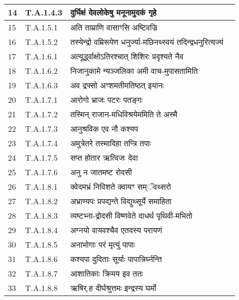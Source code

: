 \documentclass[17pt]{extarticle}
\begin{document}
\begin{longtable}{||p{0.4in}||p{0.9in}||p{4.0in}||p{0.9in}||}
        \hline
            14 & T.A.1.4.3 & दुर्भिक्षं देवलोकेषु मनूनामुदकं गृहे &      \\
        \hline
            15 & T.A.1.5.1 & अति ताम्राणि वासाꣳसि अष्टिवज्रि &      \\
        \hline
            16 & T.A.1.5.2 & तस्येन्द्रो वम्रिरूपेण धनुर्ज्या{-}मछिनथ्स्वयं तदिन्द्रधनुरित्यज्यं &      \\
        \hline
            17 & T.A.1.6.1 & अत्यूर्द्ध्वाक्षोऽतिरश्चात् शिशिरः प्रदृश्यते नैव &      \\
        \hline
            18 & T.A.1.6.2 & निजानुकामे न्यञ्जलिका अमी वाच{-}मुपासतामिति &      \\
        \hline
            19 & T.A.1.6.3 & अव द्रफ्सो अꣳशमतीमतिष्ठत् इयानः &      \\
        \hline
            20 & T.A.1.7.1 & आरोगो भ्राजः पटरः पतङ्गः &      \\
        \hline
            21 & T.A.1.7.2 & तस्मिन् राजान{-}मधिविश्रयेममिति ते अस्मै &      \\
        \hline
            22 & T.A.1.7.3 & आनुश्रविक एव नौ कश्यप &      \\
        \hline
            23 & T.A.1.7.4 & अमुत्रेतरे तस्मादिहा तप्त्रि तपाः &      \\
        \hline
            24 & T.A.1.7.5 & सप्त होतार ऋत्विजः देवा &      \\
        \hline
            25 & T.A.1.7.6 & अनु न जातमष्ट रोदसी &      \\
        \hline
            26 & T.A.1.8.1 & क्वेदमभ्रं निविशते क्वायꣳ सम्ॅवथ्सरो &      \\
        \hline
            27 & T.A.1.8.2 & अभ्राण्यपः प्रपद्यन्ते विद्युथ्सूर्ये समाहिता &      \\
        \hline
            28 & T.A.1.8.3 & व्यष्टभ्ना{-}द्रोदसी विष्णवेते दाधर्थ पृथिवी{-}मभितो &      \\
        \hline
            29 & T.A.1.8.4 & अग्नयो वायवश्चैव एतदस्य परायणं &      \\
        \hline
            30 & T.A.1.8.5 & अनाभोगाः परं मृत्युं पापाः &      \\
        \hline
            31 & T.A.1.8.6 & कश्यपा दुदिताः सूर्याः पापान्निर्घ्नन्ति &      \\
        \hline
            32 & T.A.1.8.7 & आशातिकाः क्रिमय इव ततः &      \\
        \hline
            33 & T.A.1.8.8 & ऋषिर्.ह दीर्घश्रुत्तमः इन्द्रस्य घर्मो &      \\

\end{longtable}
\end{document}
